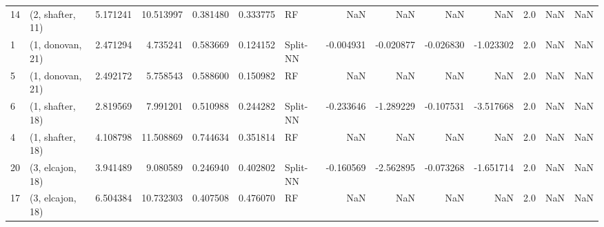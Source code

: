 \begin{tabular}{llrrrrlrrrrrrl}
14 &  (2, shafter, 11) &   5.171241 &  10.513997 &   0.381480 &  0.333775 &          RF &             NaN &           NaN &            NaN &          NaN &            2.0 &    NaN &              NaN \\
1  &  (1, donovan, 21) &   2.471294 &   4.735241 &   0.583669 &  0.124152 &    Split-NN &       -0.004931 &     -0.020877 &      -0.026830 &    -1.023302 &            2.0 &    NaN &              NaN \\
5  &  (1, donovan, 21) &   2.492172 &   5.758543 &   0.588600 &  0.150982 &          RF &             NaN &           NaN &            NaN &          NaN &            2.0 &    NaN &              NaN \\
6  &  (1, shafter, 18) &   2.819569 &   7.991201 &   0.510988 &  0.244282 &    Split-NN &       -0.233646 &     -1.289229 &      -0.107531 &    -3.517668 &            2.0 &    NaN &              NaN \\
4  &  (1, shafter, 18) &   4.108798 &  11.508869 &   0.744634 &  0.351814 &          RF &             NaN &           NaN &            NaN &          NaN &            2.0 &    NaN &              NaN \\
20 &  (3, elcajon, 18) &   3.941489 &   9.080589 &   0.246940 &  0.402802 &    Split-NN &       -0.160569 &     -2.562895 &      -0.073268 &    -1.651714 &            2.0 &    NaN &              NaN \\
17 &  (3, elcajon, 18) &   6.504384 &  10.732303 &   0.407508 &  0.476070 &          RF &             NaN &           NaN &            NaN &          NaN &            2.0 &    NaN &              NaN \\
\bottomrule
\end{tabular}
